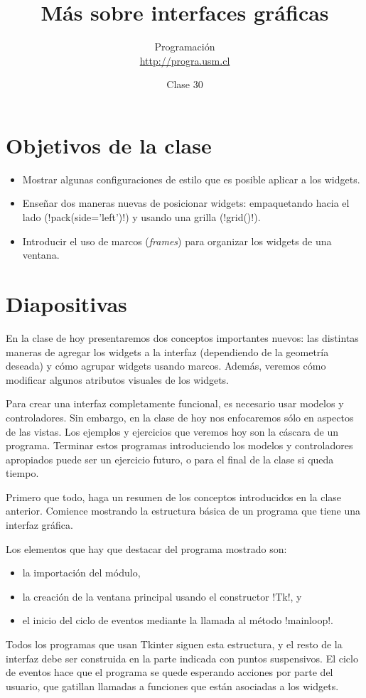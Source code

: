 \documentclass[10pt]{article}
\title{Más sobre interfaces gráficas}
\author{Programación \\ \url{http://progra.usm.cl}}
\date{Clase 30}
\begin{document}
  \maketitle

  \section*{Objetivos de la clase}
  \begin{itemize}
    \item Mostrar algunas configuraciones de estilo
      que es posible aplicar a los widgets.
    \item Enseñar dos maneras nuevas de posicionar widgets:
      empaquetando hacia el lado (\li!pack(side='left')!)
      y usando una grilla (\li!grid()!).
    \item Introducir el uso de marcos (\emph{frames})
      para organizar los widgets de una ventana.
  \end{itemize}

  \section*{Diapositivas}

  En la clase de hoy presentaremos dos conceptos importantes nuevos:
  las distintas maneras de agregar los widgets a la interfaz
  (dependiendo de la geometría deseada)
  y cómo agrupar widgets usando marcos.
  Además,
  veremos cómo modificar algunos atributos visuales de los widgets.

  Para crear una interfaz completamente funcional,
  es necesario usar modelos y controladores.
  Sin embargo,
  en la clase de hoy nos enfocaremos sólo
  en aspectos de las vistas.
  Los ejemplos y ejercicios que veremos hoy
  son la cáscara de un programa.
  Terminar estos programas introduciendo los modelos y controladores apropiados
  puede ser un ejercicio futuro, o para el final de la clase si queda tiempo.


  Primero que todo,
  haga un resumen de los conceptos introducidos en la clase anterior.
  Comience mostrando la estructura básica de un programa
  que tiene una interfaz gráfica.

  Los elementos que hay que destacar del programa mostrado son:
  \begin{itemize}
    \item la importación del módulo,
    \item la creación de la ventana principal
      usando el constructor \li!Tk!, y
    \item el inicio del ciclo de eventos
      mediante la llamada al método \li!mainloop!.
  \end{itemize}
  Todos los programas que usan Tkinter
  siguen esta estructura,
  y el resto de la interfaz debe ser construida
  en la parte indicada con puntos suspensivos.
  El ciclo de eventos
  hace que el programa se quede esperando
  acciones por parte del usuario,
  que gatillan llamadas a funciones
  que están asociadas a los widgets.
\end{document}
